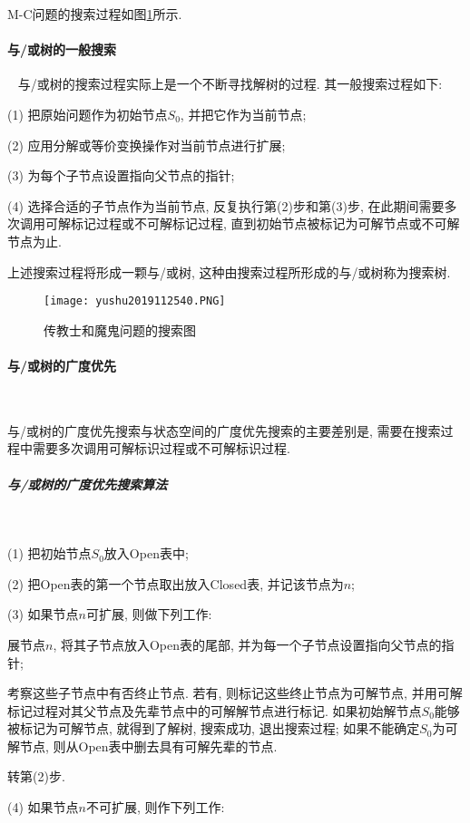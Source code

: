 M-C问题的搜索过程如图\ref{AI32fig40}所示.

\paragraph{与/或树的一般搜索}~{}
与/或树的搜索过程实际上是一个不断寻找解树的过程. 其一般搜索过程如下:

(1) 把原始问题作为初始节点$S_0$, 并把它作为当前节点;

(2) 应用分解或等价变换操作对当前节点进行扩展;

(3) 为每个子节点设置指向父节点的指针;

(4) 选择合适的子节点作为当前节点, 反复执行第(2)步和第(3)步, 在此期间需要多次调用可解标记过程或不可解标记过程, 直到初始节点被标记为可解节点或不可解节点为止.

上述搜索过程将形成一颗与/或树, 这种由搜索过程所形成的与/或树称为搜索树.
\begin{figure}[H]
\centering
\texttt{[image: yushu2019112540.PNG]}
\caption{传教士和魔鬼问题的搜索图}
\label{AI32fig40}
\end{figure}
\paragraph{与/或树的广度优先}~{}

与/或树的广度优先搜索与状态空间的广度优先搜索的主要差别是, 需要在搜索过程中需要多次调用可解标识过程或不可解标识过程.
\subparagraph{与/或树的广度优先搜索算法}~{}

(1) 把初始节点$S_0$放入Open表中;

(2) 把Open表的第一个节点取出放入Closed表, 并记该节点为$n$;

(3) 如果节点$n$可扩展, 则做下列工作:

      展节点$n$, 将其子节点放入Open表的尾部, 并为每一个子节点设置指向父节点的指针;

       考察这些子节点中有否终止节点. 若有, 则标记这些终止节点为可解节点, 并用可解标记过程对其父节点及先辈节点中的可解解节点进行标记. 如果初始解节点$S_0$能够被标记为可解节点, 就得到了解树, 搜索成功, 退出搜索过程;
        如果不能确定$S_0$为可解节点, 则从Open表中删去具有可解先辈的节点.

      转第(2)步.

(4) 如果节点$n$不可扩展, 则作下列工作:

